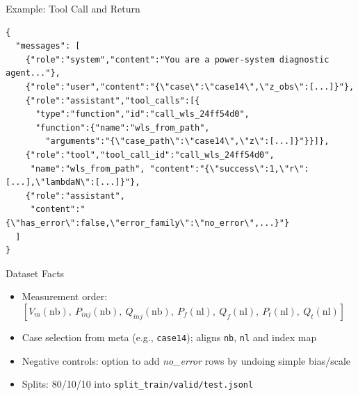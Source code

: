 \documentclass{beamer}
\begin{document}
\begin{frame}[fragile]{Example: Tool Call and Return}
\begin{lstlisting}[style=json]
{
  "messages": [
    {"role":"system","content":"You are a power-system diagnostic agent..."},
    {"role":"user","content":"{\"case\":\"case14\",\"z_obs\":[...]}"},
    {"role":"assistant","tool_calls":[{
      "type":"function","id":"call_wls_24ff54d0",
      "function":{"name":"wls_from_path",
        "arguments":"{\"case_path\":\"case14\",\"z\":[...]}"}}]},
    {"role":"tool","tool_call_id":"call_wls_24ff54d0",
     "name":"wls_from_path", "content":"{\"success\":1,\"r\":[...],\"lambdaN\":[...]}"},
    {"role":"assistant",
     "content":"{\"has_error\":false,\"error_family\":\"no_error\",...}"}
  ]
}
\end{lstlisting}
\end{frame}

\begin{frame}{Dataset Facts}
  \begin{itemize}
    \item Measurement order: $[V_m(\text{nb}),\ P_{inj}(\text{nb}),\ Q_{inj}(\text{nb}),\ P_f(\text{nl}),\ Q_f(\text{nl}),\ P_t(\text{nl}),\ Q_t(\text{nl})]$
    \item Case selection from meta (e.g., \texttt{case14}); aligns \texttt{nb}, \texttt{nl} and index map
    \item Negative controls: option to add \textit{no\_error} rows by undoing simple bias/scale
    \item Splits: 80/10/10 into \texttt{split\_train/valid/test.jsonl}
  \end{itemize}
\end{frame}
\end{document}

